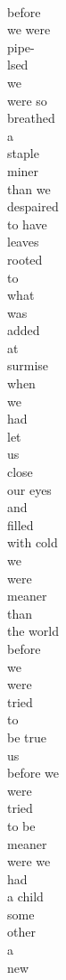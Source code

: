 \documentclass[smalldemyvopaper,11pt,twoside,onecolumn,openright,extrafontsizes]{memoir}
\begin{document}
\\before
\\we were
\\pipe-
\\lsed
\\we
\\were so
\\breathed
\\a
\\staple
\\miner
\\than we
\\despaired
\\to have
\\leaves
\\rooted
\\to
\\what
\\was
\\added
\\at
\\surmise
\\when
\\we
\\had
\\let
\\us
\\close
\\our eyes
\\and
\\filled
\\with cold
\\we
\\were
\\meaner
\\than
\\the world
\\before
\\we
\\were
\\tried
\\to
\\be true
\\us
\\before we
\\were
\\tried
\\to be
\\meaner
\\were we
\\had
\\a child
\\some
\\other
\\a
\\new
\end{document}
